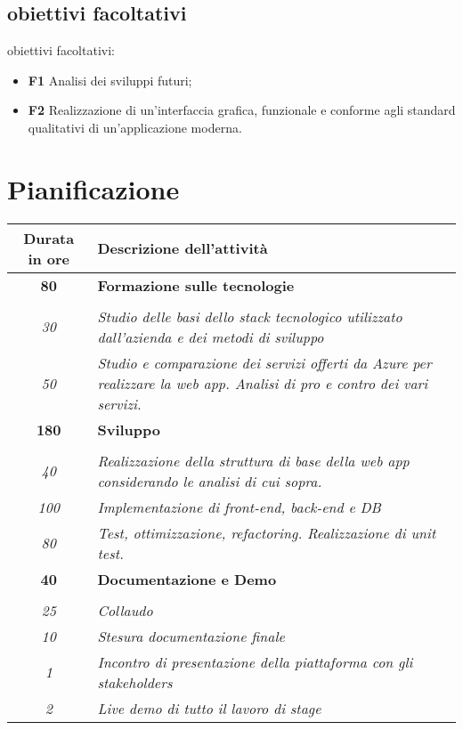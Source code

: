 \subsection{obiettivi facoltativi}
obiettivi facoltativi:
\begin{itemize}
    \item \textbf{F1} Analisi dei sviluppi futuri;
    \item \textbf{F2} Realizzazione di un'interfaccia grafica, funzionale e conforme agli standard qualitativi di un'applicazione moderna.

\end{itemize}
\section{Pianificazione}
\label{sec:pianificazione}
\begin{table}[!h]
    \label{tab:ripartizione-ore}
    \begin{tabularx}{\textwidth}{|c|X|}
        \hline
        \textbf{Durata in ore} & \textbf{Descrizione dell'attività} \\\hline
        
        \textbf{80} & \textbf{Formazione sulle tecnologie} \\ \hdashline
            \multirow{2}{0cm}\\
                \textit{30} &
                \textit{Studio delle basi dello stack tecnologico utilizzato dall'azienda e dei metodi di sviluppo} \\
                \textit{50} &
                \textit{Studio e comparazione dei servizi offerti da Azure per realizzare la web app. Analisi di pro e contro dei vari servizi.} \\
        \hline
        
        \textbf{180} & \textbf{Sviluppo} \\ \hdashline 
        \multirow{3}{0cm}\\ 
        \textit{40} & 
        \textit{Realizzazione della struttura di base della web app considerando le analisi di cui sopra.} \\
        \textit{100} & 
        \textit{Implementazione di front-end, back-end e DB} \\
        \textit{80} & 
        \textit{Test, ottimizzazione, refactoring. Realizzazione di unit test.} \\
        \hline
        
        \textbf{40} & \textbf{Documentazione e Demo}  \\ \hdashline 
        \multirow{4}{0cm}\\ 
        \textit{25} & 
        \textit{Collaudo} \\
        \textit{10} & 
        \textit{Stesura documentazione finale} \\
        \textit{1} & 
        \textit{Incontro di presentazione della piattaforma con gli stakeholders} \\
        \textit{2} & 
        \textit{Live demo di tutto il lavoro di stage} \\
        \hline
        

\end{tabularx}
\end{table}
